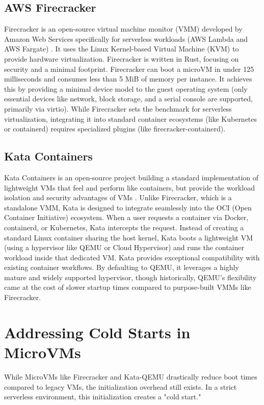 \documentclass[12pt,a4paper]{report}
\begin{document}
\subsection{AWS Firecracker}
Firecracker is an open-source virtual machine monitor (VMM) developed by Amazon Web Services specifically for serverless workloads (AWS Lambda and AWS Fargate) \cite{agache2020firecracker}. It uses the Linux Kernel-based Virtual Machine (KVM) to provide hardware virtualization. Firecracker is written in Rust, focusing on security and a minimal footprint.
Firecracker can boot a microVM in under 125 milliseconds and consumes less than 5 MiB of memory per instance. It achieves this by providing a minimal device model to the guest operating system (only essential devices like network, block storage, and a serial console are supported, primarily via virtio). While Firecracker sets the benchmark for serverless virtualization, integrating it into standard container ecosystems (like Kubernetes or containerd) requires specialized plugins (like firecracker-containerd).

\subsection{Kata Containers}
Kata Containers is an open-source project building a standard implementation of lightweight VMs that feel and perform like containers, but provide the workload isolation and security advantages of VMs \cite{kata2023}.
Unlike Firecracker, which is a standalone VMM, Kata is designed to integrate seamlessly into the OCI (Open Container Initiative) ecosystem. When a user requests a container via Docker, containerd, or Kubernetes, Kata intercepts the request. Instead of creating a standard Linux container sharing the host kernel, Kata boots a lightweight VM (using a hypervisor like QEMU or Cloud Hypervisor) and runs the container workload inside that dedicated VM.
Kata provides exceptional compatibility with existing container workflows. By defaulting to QEMU, it leverages a highly mature and widely supported hypervisor, though historically, QEMU's flexibility came at the cost of slower startup times compared to purpose-built VMMs like Firecracker.

\section{Addressing Cold Starts in MicroVMs}
While MicroVMs like Firecracker and Kata-QEMU drastically reduce boot times compared to legacy VMs, the initialization overhead still exists. In a strict serverless environment, this initialization creates a "cold start."
\end{document}
